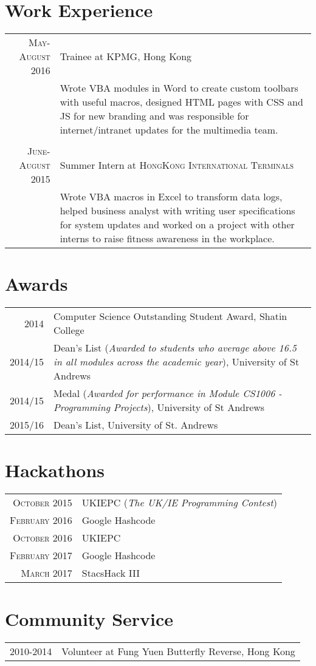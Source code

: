 \documentclass{article}
\begin{document}
\section*{Work Experience}
\begin{tabular}{r|p{14cm}}

\textsc{May-August 2016} & Trainee at \textsc{KPMG}, Hong Kong \\
 
&\footnotesize{Wrote VBA modules in Word to create custom toolbars with useful macros, designed HTML pages with CSS and JS for new branding and was responsible for internet/intranet updates for the multimedia team.}\\\multicolumn{2}{c}{} \\


\textsc{June-August 2015} & Summer Intern at \textsc{HongKong International Terminals} \\

&\footnotesize{Wrote VBA macros in Excel to transform data logs, helped business analyst with writing user specifications for system updates and worked on a project with other interns to raise fitness awareness in the workplace.}\\
\end{tabular}

\section*{Awards}
\begin{tabular}{r|p{16cm}}

\textsc{2014} & Computer Science Outstanding Student Award, Shatin College \\

\textsc{2014/15} & Dean’s List (\textit{Awarded to students who average above 16.5 in all modules across the academic year}), University of St Andrews\\

\textsc{2014/15} & Medal (\textit{Awarded for performance in Module CS1006 - Programming Projects}), University of St Andrews\\

\textsc{2015/16} & Dean's List, University of St. Andrews \\

\end{tabular}

\section*{Hackathons}
\begin{tabular}{r|p{14cm}}
\textsc{October 2015} & UKIEPC (\textit{The UK/IE Programming Contest})\\
\textsc{February 2016} & Google Hashcode \\
\textsc{October 2016} & UKIEPC \\
\textsc{February 2017} & Google Hashcode \\
\textsc{March 2017} & StacsHack III \\
\end{tabular}
\section*{Community Service}
\begin{tabular}{r|p{14cm}}
\textsc{2010-2014} & Volunteer at Fung Yuen Butterfly Reverse, Hong Kong \\
\end{tabular}
\end{document}
